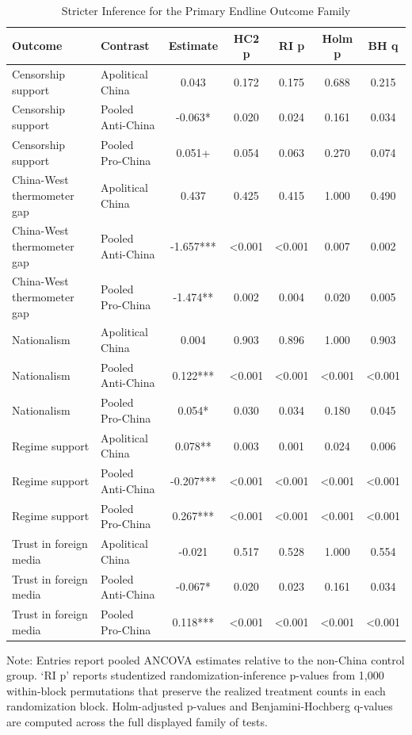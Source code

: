 \begin{table}[H]
\centering
\caption{Stricter Inference for the Primary Endline Outcome Family}
\label{tab:strict_primary_family_t1}
\footnotesize
\begin{threeparttable}
\begin{tabular}{llccccc}
\toprule
Outcome & Contrast & Estimate & HC2 p & RI p & Holm p & BH q \\
\midrule
Censorship support & Apolitical China & 0.043 & 0.172 & 0.175 & 0.688 & 0.215 \\
Censorship support & Pooled Anti-China & -0.063* & 0.020 & 0.024 & 0.161 & 0.034 \\
Censorship support & Pooled Pro-China & 0.051+ & 0.054 & 0.063 & 0.270 & 0.074 \\
China-West thermometer gap & Apolitical China & 0.437 & 0.425 & 0.415 & 1.000 & 0.490 \\
China-West thermometer gap & Pooled Anti-China & -1.657*** & <0.001 & <0.001 & 0.007 & 0.002 \\
China-West thermometer gap & Pooled Pro-China & -1.474** & 0.002 & 0.004 & 0.020 & 0.005 \\
Nationalism & Apolitical China & 0.004 & 0.903 & 0.896 & 1.000 & 0.903 \\
Nationalism & Pooled Anti-China & 0.122*** & <0.001 & <0.001 & <0.001 & <0.001 \\
Nationalism & Pooled Pro-China & 0.054* & 0.030 & 0.034 & 0.180 & 0.045 \\
Regime support & Apolitical China & 0.078** & 0.003 & 0.001 & 0.024 & 0.006 \\
Regime support & Pooled Anti-China & -0.207*** & <0.001 & <0.001 & <0.001 & <0.001 \\
Regime support & Pooled Pro-China & 0.267*** & <0.001 & <0.001 & <0.001 & <0.001 \\
Trust in foreign media & Apolitical China & -0.021 & 0.517 & 0.528 & 1.000 & 0.554 \\
Trust in foreign media & Pooled Anti-China & -0.067* & 0.020 & 0.023 & 0.161 & 0.034 \\
Trust in foreign media & Pooled Pro-China & 0.118*** & <0.001 & <0.001 & <0.001 & <0.001 \\
\bottomrule
\end{tabular}
\begin{tablenotes}[flushleft]
\footnotesize
\item Note: Entries report pooled ANCOVA estimates relative to the non-China control group. `RI p' reports studentized randomization-inference p-values from 1,000 within-block permutations that preserve the realized treatment counts in each randomization block. Holm-adjusted p-values and Benjamini-Hochberg q-values are computed across the full displayed family of tests.
\end{tablenotes}
\end{threeparttable}
\end{table}
